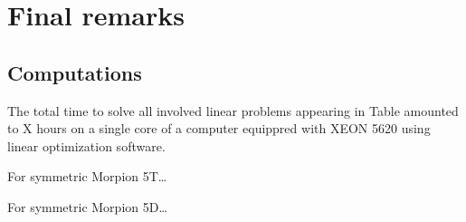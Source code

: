 \section{Final remarks}

\subsection{Computations}
The total time to solve all involved linear problems appearing in Table amounted to X hours on a single core of a computer equippred with XEON 5620 using 
\cite{gurobi} linear optimization software. 

For symmetric Morpion 5T\ldots

For symmetric Morpion 5D\ldots

